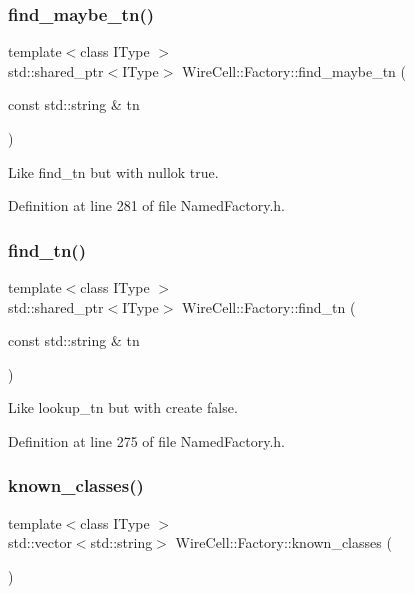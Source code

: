 \subsubsection{\texorpdfstring{find\+\_\+maybe\+\_\+tn()}{find\_maybe\_tn()}}
{\footnotesize\ttfamily template$<$class I\+Type $>$ \\
std\+::shared\+\_\+ptr$<$I\+Type$>$ Wire\+Cell\+::\+Factory\+::find\+\_\+maybe\+\_\+tn (\begin{DoxyParamCaption}\item[{const std\+::string \&}]{tn }\end{DoxyParamCaption})}



Like find\+\_\+tn but with nullok true. 



Definition at line 281 of file Named\+Factory.\+h.

\mbox{\label{namespace_wire_cell_1_1_factory_a19e5e02dfbb9f332865af3b41b3c302a}} 
\subsubsection{\texorpdfstring{find\+\_\+tn()}{find\_tn()}}
{\footnotesize\ttfamily template$<$class I\+Type $>$ \\
std\+::shared\+\_\+ptr$<$I\+Type$>$ Wire\+Cell\+::\+Factory\+::find\+\_\+tn (\begin{DoxyParamCaption}\item[{const std\+::string \&}]{tn }\end{DoxyParamCaption})}



Like lookup\+\_\+tn but with create false. 



Definition at line 275 of file Named\+Factory.\+h.

\mbox{\label{namespace_wire_cell_1_1_factory_abfc39deedef2d6c44f0c9af364bcdd2d}} 
\subsubsection{\texorpdfstring{known\+\_\+classes()}{known\_classes()}}
{\footnotesize\ttfamily template$<$class I\+Type $>$ \\
std\+::vector$<$std\+::string$>$ Wire\+Cell\+::\+Factory\+::known\+\_\+classes (\begin{DoxyParamCaption}{ }\end{DoxyParamCaption})}



